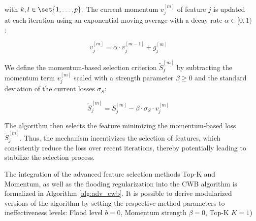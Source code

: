 \documentclass[fontsize=12 pt]{scrartcl}
\begin{document}
with $k,l \in \set{1, \dots ,p}$. The current momentum $v_j^{[m]}$ of feature $j$ is updated at each iteration using an exponential moving average with a decay rate $\alpha \in [0, 1)$:

\begin{equation}
    v_j^{[m]} = \alpha \cdot v_j^{[m-1]} + g_j^{[m]}
\end{equation}

We define the momentum-based selection criterion $\tilde{S}_j^{[m]}$ by subtracting the momentum term $v_j^{[m]}$ scaled with a strength parameter $\beta \ge 0$ and the standard deviation of the current losses $\sigma_S$:

\begin{equation}
    \tilde{S}_j^{[m]} = S_j^{[m]} - \beta \cdot \sigma_S \cdot v_j^{[m]}
\end{equation}

The algorithm then selects the feature minimizing the momentum-based loss $\tilde{S}_j^{[m]}$. Thus, the mechanism incentivizes the selection of features, which consistently reduce the loss over recent iterations, thereby potentially leading to stabilize the selection process.

The integration of the advanced feature selection methods Top-K and Momentum, as well as the flooding regularization into the CWB algorithm is formalized in Algorithm \ref{alg:adv_cwb}. It is possible to derive modularized versions of the algorithm by setting the respective method parameters to ineffectiveness levels: Flood level $b=0$, Momentum strength $\beta=0$, Top-K $K=1$)
\end{document}
